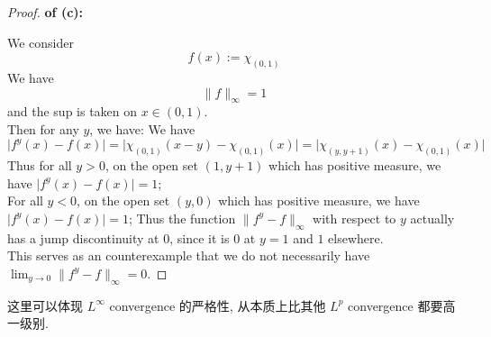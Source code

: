 \documentclass[lang=cn,11pt]{elegantbook}
\begin{document}
\begin{proof}
    \textbf{of (c):}\\

We consider 
\[
   f(x) := \chi_{(0,1)}
\]
We have \[
\| f \|_\infty = 1
\]
and the sup is taken on $x \in (0,1)$.\\
Then for any $y$, we have: We have
\[
   \bigl\lvert f^y(x) - f(x)\bigr\rvert   =
   \bigl\lvert \chi_{(0,1)}(x - y) - \chi_{(0,1)}(x) \bigr\rvert = \bigl\lvert \chi_{(y,y+1)}(x ) - \chi_{(0,1)}(x) \bigr\rvert 
\]
Thus for all $y > 0$, on the open set $(1,y+1)$ which has positive measure, we have \( \bigl\lvert f^y(x) - f(x)\bigr\rvert  = 1
\); \\
For all $y<0$, on the open set $(y,0)$ which has positive measure, we have \( \bigl\lvert f^y(x) - f(x)\bigr\rvert  = 1
\);
Thus the function $\|f^y - f\|_\infty$ with respect to $y$ actually has a jump discontinuity at $0$, since it is $0$ at $y=1$ and $1$ elsewhere.\\
This serves as an counterexample that we do not necessarily have $\lim_{y\to0}\|f^y-f\|_\infty=0$.
\end{proof}
\begin{remark}
    这里可以体现 $L^\infty$ convergence 的严格性, 从本质上比其他 $L^p$ convergence 都要高一级别. 
\end{remark}
\end{document}

